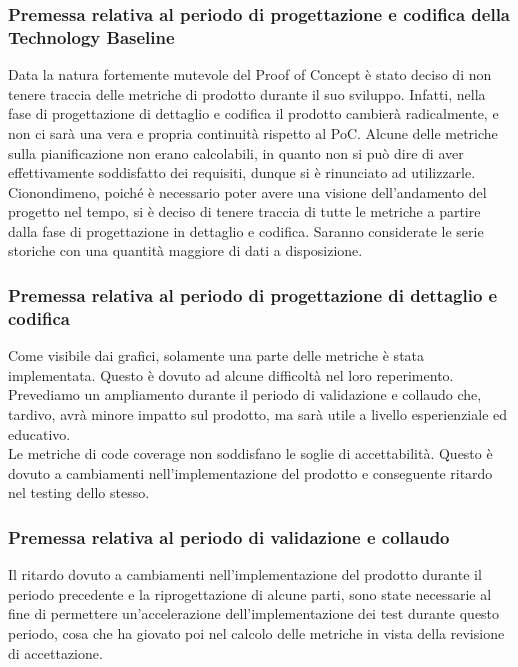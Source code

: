 \subsubsection{Premessa relativa al periodo di progettazione e codifica della Technology Baseline}
Data la natura fortemente mutevole del Proof of Concept è stato deciso di non tenere traccia delle metriche di prodotto durante il suo sviluppo. Infatti, nella fase di progettazione di dettaglio e codifica il prodotto cambierà radicalmente, e non ci sarà una vera e propria continuità rispetto al PoC. \newline
Alcune delle metriche sulla pianificazione non erano calcolabili, in quanto non si può dire di aver effettivamente soddisfatto dei requisiti, dunque si è rinunciato ad utilizzarle.
Cionondimeno, poiché è necessario poter avere una visione dell'andamento del progetto nel tempo, si è deciso di tenere traccia di tutte le metriche a partire dalla fase di progettazione in dettaglio e codifica. Saranno considerate le serie storiche con una quantità maggiore di dati a disposizione.
\subsubsection{Premessa relativa al periodo di progettazione di dettaglio e codifica}
Come visibile dai grafici, solamente una parte delle metriche è stata implementata. Questo è dovuto ad alcune difficoltà nel loro reperimento.
Prevediamo un ampliamento durante il periodo di validazione e collaudo che, tardivo, avrà minore impatto sul prodotto, ma sarà utile a livello esperienziale ed educativo.\\
Le metriche di code coverage non soddisfano le soglie di accettabilità. Questo è dovuto a cambiamenti nell'implementazione del prodotto e conseguente ritardo nel testing dello stesso.
\subsubsection{Premessa relativa al periodo di validazione e collaudo}
Il ritardo dovuto a cambiamenti nell'implementazione del prodotto durante il periodo precedente e la riprogettazione di alcune parti, sono state necessarie al fine di permettere un'accelerazione dell'implementazione dei test durante questo periodo, cosa che ha giovato poi nel calcolo delle metriche in vista della revisione di accettazione.
